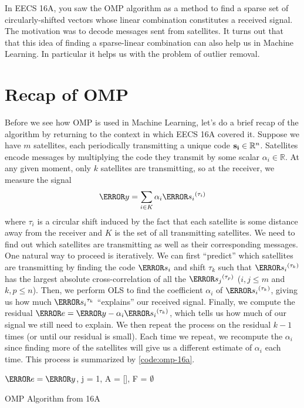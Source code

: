 

\renewcommand{\documentnumber}{x}


  \thispagestyle{fancy}
  \newpage

  In EECS 16A, you saw the OMP algorithm as a method to find a sparse set of circularly-shifted vectors whose linear combination constitutes a received signal.
  The motivation was to decode messages sent from satellites. 
  It turns out that that this idea of finding a sparse-linear combination can also help us in Machine Learning. 
  In particular it helps us with the problem of outlier removal.
  \section{Recap of OMP}
  Before we see how OMP is used in Machine Learning, let's do a brief recap of the algorithm by returning to the context in which EECS 16A covered it. 
  Suppose we have $m$ satellites, each periodically transmitting a unique code $\mathbf{s_i}\in\mathbb{R}^n$. 
  Satellites encode messages by multiplying the code they transmit by some scalar $\alpha_i\in\mathbb{R}$.
  At any given moment, only $k$ satellites are transmitting, so at the receiver, we measure the signal
  \[
	\V{y} = \sum_{i\in K} \alpha_i\V{s_i}^{(\tau_i)}
  \]
  where $\tau_i$ is a circular shift induced by the fact that each satellite is some distance away from the receiver and $K$ is the set of all transmitting satellites.
  We need to find out which satellites are transmitting as well as their corresponding messages.
  One natural way to proceed is iteratively. We can first ``predict'' which satellites are transmitting by finding the code $\V{s_i}$ and shift $\tau_k$ such that $\V{s_i}^{(\tau_k)}$ has the largest absolute cross-correlation of all the $\V{s_j}^{(\tau_p)}$ ($i, j \leq m$ and $k, p \leq n$).
  Then, we perform OLS to find the coefficient $\alpha_i$ of $\V{s_i}^{(\tau_k)}$, giving us how much $\V{s_i}^{\tau_k}$ ``explains'' our received signal.
  Finally, we compute the residual $\V{e} = \V{y} - \alpha_i\V{s_i}^{(\tau_k)}$, which tells us how much of our signal we still need to explain.
  We then repeat the process on the residual $k-1$ times (or until our residual is small).
  Each time we repeat, we recompute the $\alpha_i$ since finding more of the satellites will give us a different estimate of $\alpha_i$ each time.
  This process is summarized by \cref{code:omp-16a}.
  \begin{algorithm}[!h]
	\SetAlgoLined
	$\V{e} = \V{y}$, j = 1, A = [], F = $\emptyset$\;
	\caption{OMP Algorithm from 16A}
	\label{code:omp-16a}
  \end{algorithm}
